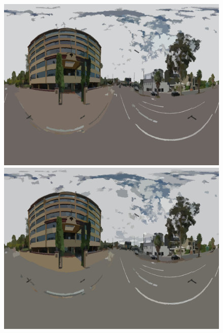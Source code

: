 \documentclass{article}
\begin{document}
\begin{figure}
\end{figure} 

\clearpage %

\begin{figure}
\centering    
\textbf{}\includegraphics[scale=0.08]{Images/mean/4880_3_6_100.png} 
\textbf{}\includegraphics[scale=0.08]{Images/mean/4880_7_6_100.png} 

\end{figure}
\end{document}
